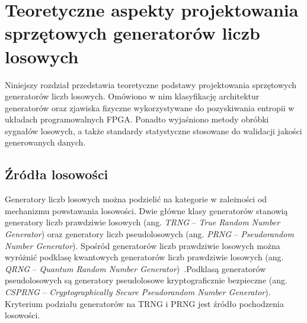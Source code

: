 \chapter{Teoretyczne aspekty projektowania sprzętowych generatorów liczb losowych}



\noindent Niniejszy rozdział przedstawia teoretyczne podstawy projektowania 
sprzętowych generatorów liczb losowych. Omówiono w nim klasyfikację architektur 
generatorów oraz zjawiska fizyczne wykorzystywane do pozyskiwania entropii w 
układach programowalnych FPGA. Ponadto wyjaśniono metody obróbki sygnałów 
losowych, a także standardy statystyczne stosowane do walidacji jakości 
generowanych danych.

\section{Źródła losowości}

\noindent Generatory liczb losowych można podzielić na kategorie w zależności 
od mechanizmu powstawania losowości. Dwie główne klasy generatorów stanowią 
generatory liczb prawdziwie losowych (ang. \textit{TRNG} -- \textit{True Random Number Generator}) 
oraz generatory liczb pseudolosowych (ang. \textit{PRNG} -- \textit{Pseudorandom Number Generator}). 
Spośród generatorów liczb prawdziwie losowych można wyróżnić podklasę 
kwantowych generatorów liczb prawdziwie losowych (ang. \textit{QRNG} -- \textit{Quantum Random Number 
Generator})~\cite{2025QRNG-zeshan}.Podklasą generatorów pseudolosowych są generatory pseudolosowe kryptograficznie 
bezpieczne (ang. \textit{CSPRNG} -- \textit{Cryptographically Secure Pseudorandom Number Generator}). 
Kryterium podziału generatorów na TRNG i PRNG jest źródło pochodzenia losowości. 


